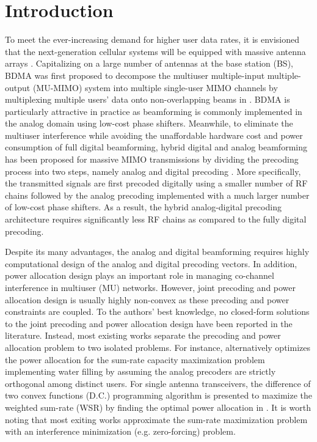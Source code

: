 \documentclass[10pt,journal,twocolumn,twoside]{IEEEtran}
\begin{document}

\section{Introduction}\label{sec:introduction}
To meet the ever-increasing demand for higher user data rates, it is envisioned that the next-generation cellular systems will be equipped with massive antenna arrays \cite{molisch2005capacity}. Capitalizing on a large number of antennas at the base station (BS), BDMA was first proposed to decompose the multiuser multiple-input multiple-output (MU-MIMO) system into multiple single-user MIMO channels by multiplexing multiple users' data onto non-overlapping beams in \cite{sun2015beam}. BDMA is particularly attractive in practice as beamforming is commonly implemented in the analog domain using low-cost phase shifters. Meanwhile, to eliminate the multiuser interference while avoiding the unaffordable hardware cost and power consumption of full digital beamforming, hybrid digital and analog beamforming has been proposed for massive MIMO transmissions by dividing the precoding process into two steps, namely analog and digital precoding \cite{alkhateeb2014channel}. More specifically, the transmitted signals are first precoded digitally using a smaller number of RF chains followed by the analog precoding implemented with a much larger number of low-cost phase shifters. As a result, the hybrid analog-digital precoding architecture requires significantly less RF chains as compared to the fully digital precoding.

Despite its many advantages, the analog and digital beamforming requires highly computational design of the analog and digital precoding vectors. In addition, power allocation design plays an important role in managing co-channel interference in multiuser (MU) networks. However, joint precoding and power allocation design is usually highly non-convex as these precoding and power constraints are coupled. To the authors' best knowledge, no closed-form solutions to the joint precoding and power allocation design have been reported in the literature. Instead, most existing works separate the precoding and power allocation problem to two isolated problems. For instance, \cite{sohrabi2016hybrid} alternatively optimizes the power allocation for the sum-rate capacity maximization problem implementing water filling by assuming the analog precoders are strictly orthogonal among distinct users. For single antenna transceivers, the difference of two convex functions (D.C.) programming algorithm is presented to maximize the weighted sum-rate (WSR) by finding the optimal power allocation in \cite{kha2012fast}. It is worth noting that most exiting works approximate the sum-rate maximization problem with an interference minimization (e.g. zero-forcing) problem.
\end{document}
